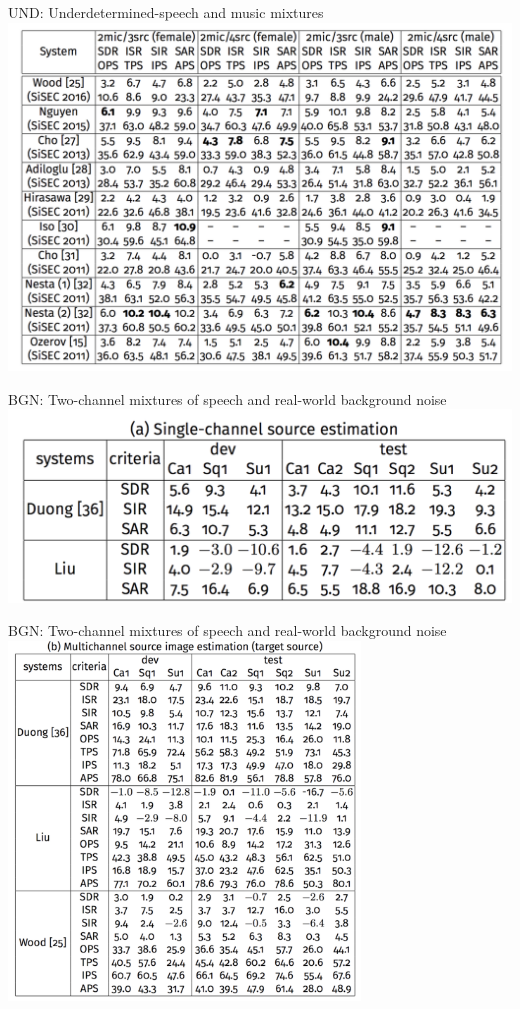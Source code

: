 \documentclass{beamer}
\begin{document}
\begin{frame}{UND: Underdetermined-speech and music mixtures}
\includegraphics[width=\textwidth]{fig/UND.png}
\end{frame}

\begin{frame}{BGN: Two-channel mixtures of speech and real-world background noise}
\includegraphics[width=\textwidth]{fig/BGN1.png}
\end{frame}

\begin{frame}{BGN: Two-channel mixtures of speech and real-world background noise}
\includegraphics[width=0.7\textwidth]{fig/BGN2.png}
\end{frame}
\end{document}
